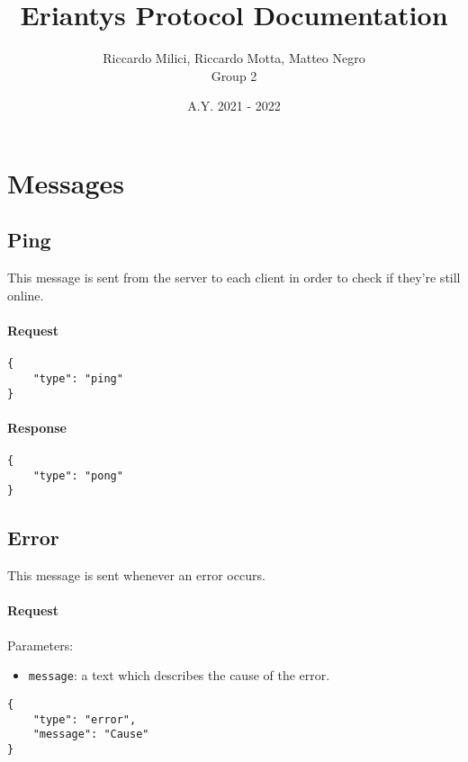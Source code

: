\documentclass[a4paper]{article}
\title{\textbf{Eriantys Protocol Documentation}}
\author{Riccardo Milici, Riccardo Motta, Matteo Negro\\Group 2}
\date{A.Y. 2021 - 2022}
\begin{document}
	\maketitle

	\tableofcontents

	\pagebreak

	\section{Messages}

	\subsection{Ping}

	This message is sent from the server to each client in order to check if they're still online.

	\paragraph{Request}

	\begin{verbatim}
{
	"type": "ping"
}
	\end{verbatim}

	\paragraph{Response}

	\begin{verbatim}
{
	"type": "pong"
}
	\end{verbatim}

	\subsection{Error}

	This message is sent whenever an error occurs.

	\paragraph{Request} Parameters:

	\begin{itemize}
		\item \verb|message|: a text which describes the cause of the error.
	\end{itemize}

	\begin{verbatim}
{
	"type": "error",
	"message": "Cause"
}
	\end{verbatim}
\end{document}
